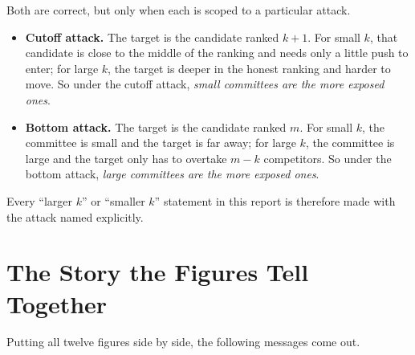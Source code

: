 \documentclass[11pt,a4paper]{article}
\begin{document}
Both are correct, but only when each is scoped to a particular attack.

\begin{itemize}
  \item \textbf{Cutoff attack.} The target is the candidate ranked \(k+1\).
        For small \(k\), that candidate is close to the middle of the
        ranking and needs only a little push to enter; for large \(k\), the
        target is deeper in the honest ranking and harder to move. So under
        the cutoff attack, \emph{small committees are the more exposed ones}.
  \item \textbf{Bottom attack.} The target is the candidate ranked \(m\).
        For small \(k\), the committee is small and the target is far away;
        for large \(k\), the committee is large and the target only has to
        overtake \(m - k\) competitors. So under the bottom attack,
        \emph{large committees are the more exposed ones}.
\end{itemize}

Every ``larger \(k\)'' or ``smaller \(k\)'' statement in this report is
therefore made with the attack named explicitly.

\section{The Story the Figures Tell Together}

Putting all twelve figures side by side, the following messages come out.
\end{document}

